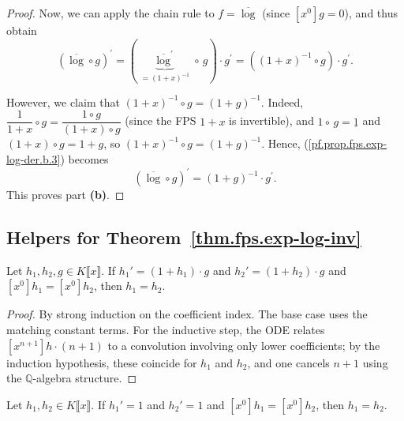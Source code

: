 \begin{proof}
Now, we can apply the chain rule to $f=\overline{\log}$ (since $\left[x^{0}\right]g=0$), and
thus obtain
\begin{equation}
\left(\overline{\log}\circ g\right)^{\prime}=\left(\underbrace{\overline
{\log}^{\prime}}_{=\left(1+x\right)^{-1}}\circ\,g\right)\cdot g^{\prime
}=\left(\left(1+x\right)^{-1}\circ g\right)\cdot g^{\prime}.
\label{pf.prop.fps.exp-log-der.b.3}
\end{equation}

However, we claim that $\left(1+x\right)^{-1}\circ g=\left(1+g\right)
^{-1}$. Indeed, $\dfrac{1}{1+x}\circ g=\dfrac{1\circ
g}{\left(1+x\right)\circ g}$ (since the FPS $1+x$ is invertible), and
$1\circ\,g=\underline{1}$ and
$\left(1+x\right)\circ g=1+g$,
so $\left(1+x\right)^{-1}\circ g=\left(1+g\right)^{-1}$. Hence, (\ref{pf.prop.fps.exp-log-der.b.3})
becomes
\[
\left(\overline{\log}\circ g\right)^{\prime}=\left(1+g\right)^{-1}\cdot
g^{\prime}.
\]
This proves part \textbf{(b)}.
\end{proof}

\subsection{Helpers for Theorem~\ref{thm.fps.exp-log-inv}}

\begin{lemma}[ODE uniqueness: $h' = (1+h) \cdot g$]
\label{lem.fps.ode-uniqueness-mul-inv}
\leanhelper
\leanok
Let $h_1, h_2, g \in K\llbracket x \rrbracket$.
If $h_1' = (1 + h_1) \cdot g$ and $h_2' = (1 + h_2) \cdot g$
and $[x^0] h_1 = [x^0] h_2$, then $h_1 = h_2$.
\end{lemma}

\begin{proof}
By strong induction on the coefficient index.
The base case uses the matching constant terms.
For the inductive step, the ODE relates $[x^{n+1}] h \cdot (n+1)$ to a
convolution involving only lower coefficients; by the induction hypothesis,
these coincide for $h_1$ and $h_2$, and one cancels $n+1$ using the
$\mathbb{Q}$-algebra structure.
\end{proof}

\begin{lemma}[ODE uniqueness: $h' = 1$]
\label{lem.fps.ode-uniqueness-one}
\leanhelper
\leanok
Let $h_1, h_2 \in K\llbracket x \rrbracket$.
If $h_1' = 1$ and $h_2' = 1$ and $[x^0] h_1 = [x^0] h_2$,
then $h_1 = h_2$.
\end{lemma}

